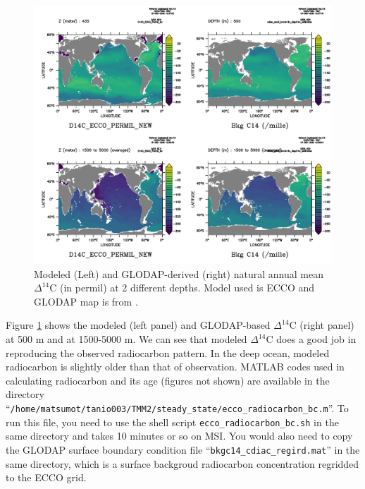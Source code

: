 \documentclass[a4paper]{article}
\begin{document}
\begin{enumerate}[label=(\arabic*)]
\begin{figure}[h!]   %
   \centering
   \includegraphics[scale=0.65]{D14C_ecco.pdf}
   \caption[]{Modeled (Left) and GLODAP-derived (right) natural annual mean $\Delta^{14}\mathrm{C}$ (in permil) at 2 different depths. Model used is ECCO and GLODAP map is from \cite{Key04}.}
   \label{fig:c14_ecco}
\end{figure}

Figure \ref{fig:c14_ecco} shows the modeled (left panel) and GLODAP-based $\Delta^{14}\mathrm{C}$ (right panel) at 500 m and at 1500-5000 m. We can see that modeled $\Delta^{14}\mathrm{C}$ does a good job in reproducing the observed radiocarbon pattern. In the deep ocean, modeled radiocarbon is slightly older than that of observation.  MATLAB codes used in calculating radiocarbon and its  age (figures not shown) are available in the directory \\ ``\verb|/home/matsumot/tanio003/TMM2/steady_state/ecco_radiocarbon_bc.m|''. To run this file, you need to use the shell script \verb|ecco_radiocarbon_bc.sh| in the same directory and takes 10 minutes or so on MSI. You would also need to copy the GLODAP surface boundary condition file ``\verb|bkgc14_cdiac_regird.mat|'' in the same directory, which is a surface backgroud radiocarbon concentration regridded to the ECCO grid.


\end{enumerate}
\end{document}
